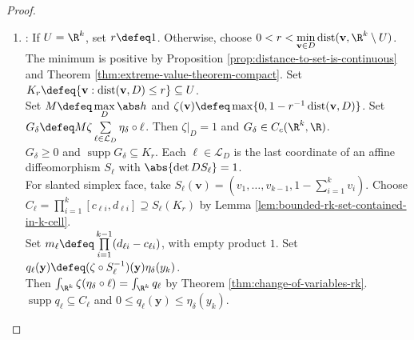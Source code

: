 \begin{theorem}
\begin{proof}
\begin{enumerate}[label=(\roman*)]
If $D=Q^k$, $\mathcal L_D\defeq\{\mathbf v\mapsto v_i:i\in J_k\}\cup\{\mathbf v\mapsto1-\sum\limits_{i=1}^{k}v_i\}$. For $\delta>0$, $\theta_\delta(t)\defeq\min\{1,\max\{0,\frac{t}{\delta}\}\}$, $\eta_\delta(t)\defeq\max\{0,1-\frac{\abs t}{\delta}\}$.\\
Set $\chi_\delta(\mathbf v)\defeq\prod\limits_{\ell\in\mathcal L_D}\theta_\delta(\ell(\mathbf v))$. On $D$, $0\leq1-\chi_\delta\leq\sum\limits_{\ell\in\mathcal L_D}\eta_\delta\circ\ell$, $\chi_\delta|_{\partial D}=0$. Set $h_\delta\defeq h\chi_\delta$ on $D$, let $F_\delta$ be its zero extension.\\
Then $F_\delta\in C_c(\R^k,\R)$ and $\operatorname{supp}F_\delta\subseteq D$. By Part (i) and Theorem \ref{thm:change-of-variables-rk}, $A_\delta\defeq\int_Dh_\delta=\int_{D'}h_\delta(R(\mathbf u))j(\mathbf u)\,d\mathbf u$.
\item {}: If $U=\R^k$, set $r\defeq1$. Otherwise, choose $0<r<\min\limits_{\mathbf v\in D}\operatorname{dist}(\mathbf v,\R^k\setminus U)$.\\
The minimum is positive by Proposition \ref{prop:distance-to-set-is-continuous} and Theorem \ref{thm:extreme-value-theorem-compact}. Set $K_r\defeq\{\mathbf v:\operatorname{dist}(\mathbf v,D)\leq r\}\subseteq U$.\\
Set $M\defeq\max\limits_D\abs h$ and $\zeta(\mathbf v)\defeq\max\{0,1-r^{-1}\operatorname{dist}(\mathbf v,D)\}$. Set $G_\delta\defeq M\zeta\sum\limits_{\ell\in\mathcal L_D}\eta_\delta\circ\ell$. Then $\zeta|_D=1$ and $G_\delta\in C_c(\R^k,\R)$.\\
$G_\delta\geq0$ and $\operatorname{supp}G_\delta\subseteq K_r$. Each $\ell\in\mathcal L_D$ is the last coordinate of an affine diffeomorphism $S_\ell$ with $\abs{\det DS_\ell}=1$.\\
For slanted simplex face, take $S_\ell(\mathbf v)=(v_1,\ldots,v_{k-1},1-\sum\limits_{i=1}^{k}v_i)$. Choose $C_\ell=\prod\limits_{i=1}^{k}[c_{\ell i},d_{\ell i}]\supseteq S_\ell(K_r)$ by Lemma \ref{lem:bounded-rk-set-contained-in-k-cell}.\\
Set $m_\ell\defeq\prod\limits_{i=1}^{k-1}(d_{\ell i}-c_{\ell i})$, with empty product $1$. Set $q_\ell(\mathbf y)\defeq(\zeta\circ S_\ell^{-1})(\mathbf y)\eta_\delta(y_k)$.\\
Then $\int_{\R^k}\zeta(\eta_\delta\circ\ell)=\int_{\R^k}q_\ell$ by Theorem \ref{thm:change-of-variables-rk}. $\operatorname{supp}q_\ell\subseteq C_\ell$ and $0\leq q_\ell(\mathbf y)\leq\eta_\delta(y_k)$.\\

\end{enumerate}
\end{proof}
\end{theorem}
